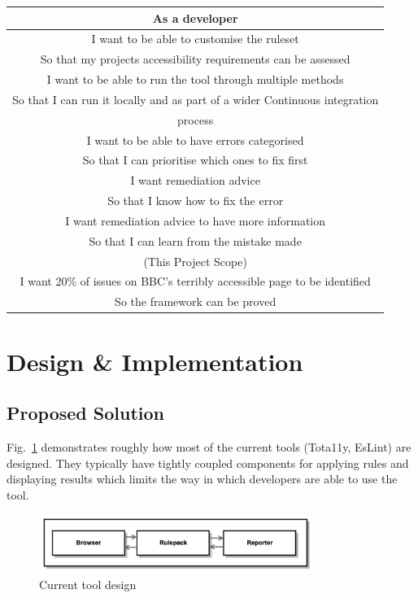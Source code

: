 \begin{center}
 \begin{tabular}{| c |}
 \hline
 As a developer \\
 \hline
 I want to be able to customise the ruleset \\
 So that my projects accessibility requirements can be assessed \\
 \hline
 I want to be able to run the tool through multiple methods \\
 So that I can run it locally and as part of a wider Continuous integration \\
 process \\
 \hline
 I want to be able to have errors categorised \\
 So that I can prioritise which ones to fix first \\
 \hline
 I want remediation advice \\
 So that I know how to fix the error \\
 \hline
 I want remediation advice to have more information \\
 So that I can learn from the mistake made \\
 \hline
 (This Project Scope) \\
 I want 20\% of issues on BBC's terribly accessible page to be identified \\
 So the framework can be proved \\
 \hline
\end{tabular}
\end{center}

\section{Design \& Implementation}
\subsection{Proposed Solution}
Fig.~\ref{fig:tool_current_design} demonstrates roughly how most of
the current tools (Tota11y, EsLint) are designed. They typically have tightly
coupled components for applying rules and displaying results which limits the
way in which developers are able to use the tool.

\begin{figure}[H]
\centering
\includegraphics[width=0.8\textwidth]{figures/a11y_tool_current_design}
\captionsetup{justification=centering}
\caption{Current tool design
\label{fig:tool_current_design}}
\end{figure}

